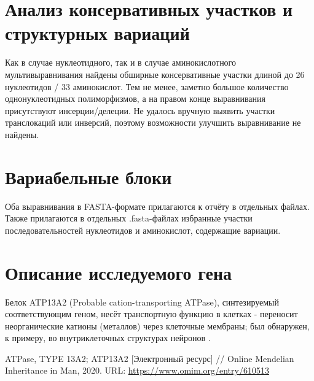 \documentclass[a4paper,12pt]{article} %
\begin{document}
	\section{Анализ консервативных участков и структурных вариаций}
	Как в случае нуклеотидного, так и в случае аминокислотного мультивыравнивания найдены обширные консервативные участки длиной до 26 нуклеотидов / 33 аминокислот. Тем не менее, заметно большое количество однонуклеотидных полиморфизмов, а на правом конце выравнивания присутствуют инсерции/делеции. Не удалось вручную выявить участки транслокаций или инверсий, поэтому возможности улучшить выравнивание не найдены.
	
	\section{Вариабельные блоки}
	Оба выравнивания в FASTA-формате прилагаются к отчёту в отдельных файлах. Также прилагаются в отдельных .fasta-файлах избранные участки последовательностей нуклеотидов и аминокислот, содержащие вариации.
	\section{Описание исследуемого гена}
	Белок ATP13A2 (Probable cation-transporting ATPase), синтезируемый соответствующим геном, несёт транспортную функцию в клетках - переносит неорганические катионы (металлов) через клеточные мембраны; был обнаружен, к примеру, во внутриклеточных структурах нейронов \cite{omim}.
	\begin{thebibliography}{99}
		 ATPase, TYPE 13A2; ATP13A2 [Электронный ресурс] // Online Mendelian Inheritance in Man, 2020. URL: \url{https://www.omim.org/entry/610513}
	\end{thebibliography}
		
		
\end{document}
